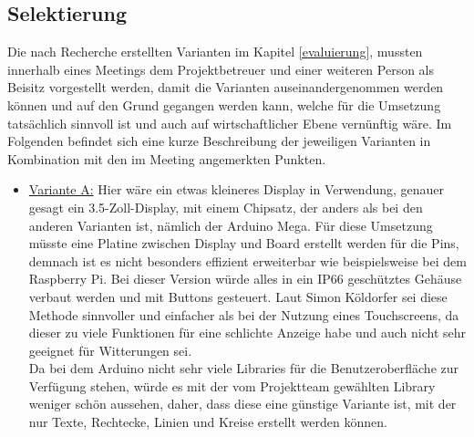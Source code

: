 \subsection{Selektierung} \label{selektierung}
Die nach Recherche erstellten Varianten im Kapitel \ref{evaluierung}, mussten innerhalb eines Meetings dem Projektbetreuer und einer weiteren Person als Beisitz vorgestellt werden, damit die Varianten auseinandergenommen werden können und auf den Grund gegangen werden kann, welche für die Umsetzung tatsächlich sinnvoll ist und auch auf wirtschaftlicher Ebene vernünftig wäre. Im Folgenden befindet sich eine kurze Beschreibung der jeweiligen Varianten in Kombination mit den im Meeting angemerkten Punkten.

\begin{itemize}
	\item \underline{Variante A:} Hier wäre ein etwas kleineres Display in Verwendung, genauer gesagt ein 3.5-Zoll-Display, mit einem Chipsatz, der anders als bei den anderen Varianten ist, nämlich der Arduino Mega. Für diese Umsetzung müsste eine Platine zwischen Display und Board erstellt werden für die Pins, demnach ist es nicht besonders effizient erweiterbar wie beispielsweise bei dem Raspberry Pi. Bei dieser Version würde alles in ein IP66 geschütztes Gehäuse verbaut werden und mit Buttons gesteuert. Laut Simon Köldorfer sei diese Methode sinnvoller und einfacher als bei der Nutzung eines Touchscreens, da dieser zu viele Funktionen für eine schlichte Anzeige habe und auch nicht sehr geeignet für Witterungen sei. \\
	Da bei dem Arduino nicht sehr viele Libraries für die Benutzeroberfläche zur Verfügung stehen, würde es mit der vom Projektteam gewählten Library weniger schön aussehen, daher, dass diese eine günstige Variante ist, mit der nur Texte, Rechtecke, Linien und Kreise erstellt werden können.
	

\end{itemize}
